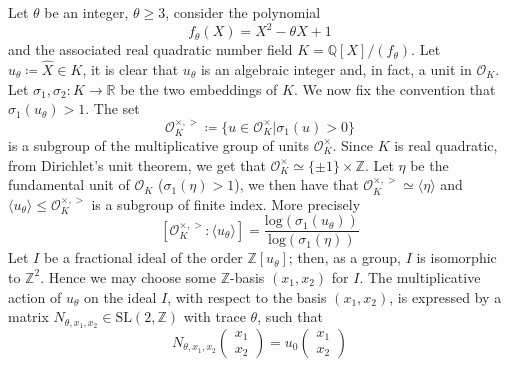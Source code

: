 \documentclass[12pt]{amsart}
\newcommand{\R}{\mathbb{R}}
\newcommand{\Z}{\mathbb{Z}}
\newcommand{\Q}{\mathbb{Q}}
\newcommand{\OO}{\mathcal{O}}
\begin{document}
Let $\theta$ be an integer, $\theta \geq 3$, consider the polynomial 
\begin{equation} \label{poly}
f_\theta(X)=X^2-\theta X+1 
\end{equation}
and the associated real quadratic number field $K=\Q[X]/(f_{\theta})$.
Let $u_\theta \coloneqq \hat{X} \in K$, it is clear that $u_\theta$ is an algebraic integer and, in fact, a unit in $\OO_K$. Let $\sigma_1, \sigma_2 : K \to \R$ be the two embeddings of $K$. We now fix the convention that $\sigma_1(u_\theta)>1$. The set 
\begin{equation}\label{halfpos}
\OO_K^{\times, >} \coloneqq \{u \in \OO_K^\times \vert \sigma_1(u) > 0\}
\end{equation}
is a subgroup of the multiplicative group of units $\OO_K^\times$.
Since $K$ is real quadratic, from Dirichlet's unit theorem, we get that $\OO_K^\times \simeq \{\pm 1\} \times \Z$. Let $\eta$ be the fundamental unit of $\OO_K$ ($\sigma_1(\eta)>1$), we then have that $\OO_K^{\times, >} \simeq \langle \eta \rangle$ and $\langle u_\theta \rangle \leq \OO_K^{\times, >}$ is a subgroup of finite index. More precisely 
\begin{equation}\label{index}
[\OO_K^{\times,>}: \langle u_\theta\rangle] = \frac{\text{log}(\sigma_1(u_\theta))}{\text{log}(\sigma_1(\eta))}
\end{equation}
Let $I$  be a fractional ideal of the order $\Z[u_\theta]$; then, as a group, $I$ is isomorphic to $\Z^2$. Hence we may choose some $\Z$-basis $(x_1,x_2)$ for $I$. The multiplicative action of $u_\theta$ on the ideal $I$, with respect to the basis $(x_1,x_2)$, is expressed by a matrix $N_{\theta,x_1,x_2}\in \text{SL}(2,\Z)$ with trace $\theta$, such that
\begin{equation}\label{AsMat}
N_{\theta,x_1,x_2} \begin{pmatrix}x_1 \\x_2\end{pmatrix}=u_0\begin{pmatrix}x_1 \\x_2\end{pmatrix}
\end{equation}
\end{document}
